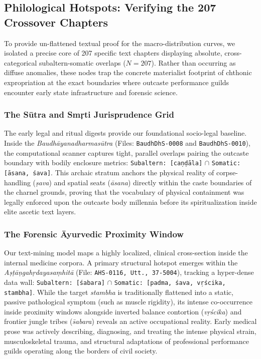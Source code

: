 \documentclass[11pt,twoside,letterpaper]{article}
\begin{document}
\subsection{Philological Hotspots: Verifying the 207 Crossover Chapters}
To provide un-flattened textual proof for the macro-distribution curves, we isolated a precise core of 207 specific text chapters displaying absolute, cross-categorical subaltern-somatic overlaps ($N = 207$). Rather than occurring as diffuse anomalies, these nodes trap the concrete materialist footprint of chthonic expropriation at the exact boundaries where outcaste performance guilds encounter early state infrastructure and forensic science.

\subsubsection{The Sūtra and \texorpdfstring{Smṛti}{Smrti} Jurisprudence Grid}The early legal and ritual digests provide our foundational socio-legal baseline. Inside the \textit{Baudhāyanadharmasūtra} (Files: \texttt{BaudhDhS-0008} and \texttt{BaudhDhS-0010}), the computational scanner captures tight, parallel overlaps pairing the outcaste boundary with bodily enclosure metrics: \texttt{Subaltern: [caṇḍāla]} $\cap$ \texttt{Somatic: [āsana, śava]}. This archaic stratum anchors the physical reality of corpse-handling (\textit{ṣava}) and spatial seats (\textit{āsana}) directly within the caste boundaries of the charnel grounds, proving that the vocabulary of physical containment was legally enforced upon the outcaste body millennia before its spiritualization inside elite ascetic text layers.

\subsubsection{The Forensic Āyurvedic Proximity Window}
Our text-mining model maps a highly localized, clinical cross-section inside the internal medicine corpora. A primary structural hotspot emerges within the \textit{Aṣṭāṇgahṛdayasaṃhitā} (File: \texttt{AHS-0116, Utt., 37-5004}), tracking a hyper-dense data wall: \texttt{Subaltern: [śabara]} $\cap$ \texttt{Somatic: [padma, śava, vṛścika, stambha]}. While the target \textit{stambha} 
is traditionally flattened into a static, passive pathological symptom (such as muscle rigidity), its intense co-occurrence inside proximity windows alongside inverted balance contortion (\textit{vṛścika}) and frontier jungle tribes (\textit{s̄abara}) reveals an active occupational reality. Early medical prose was actively describing, diagnosing, and treating the intense physical strain, musculoskeletal trauma, and structural adaptations of professional performance guilds operating along the borders of civil society.
\end{document}

